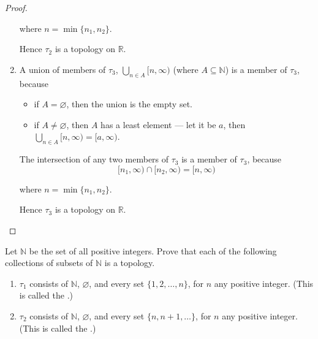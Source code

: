 \begin{proof}
\begin{enumerate}[label={(\roman*)}]
		      where $n = \min\{ n_{1}, n_{2} \}$.

		      Hence $\tau_{2}$ is a topology on $\mathbb{R}$.
		\item A union of members of $\tau_{3}$, $\bigcup_{n\in A} [n, \infty)$ (where $A\subseteq \mathbb{N}$) is a member of $\tau_{3}$, because
		      \begin{itemize}
			      \item if $A = \varnothing$, then the union is the empty set.
			      \item if $A\ne\varnothing$, then $A$ has a least element --- let it be $a$, then $\bigcup_{n\in A} [n, \infty) = [a, \infty)$.
		      \end{itemize}

		      The intersection of any two members of $\tau_{3}$ is a member of $\tau_{3}$, because
		      \[
			      [n_{1}, \infty) \cap [n_{2}, \infty) = [n, \infty)
		      \]

		      where $n = \min\{ n_{1}, n_{2} \}$.

		      Hence $\tau_{3}$ is a topology on $\mathbb{R}$.
	\end{enumerate}
\end{proof}
\newpage

\begin{exercise}
	Let $\mathbb{N}$ be the set of all positive integers. Prove that each of the following collections of subsets of $\mathbb{N}$ is a topology.
	\begin{enumerate}[label={(\roman*)}]
		\item $\tau_{1}$ consists of $\mathbb{N}$, $\varnothing$, and every set $\{ 1, 2, \ldots, n \}$, for $n$ any positive integer. (This is called the {\color{red}{initial segment topology}}.)
		\item $\tau_{2}$ consists of $\mathbb{N}$, $\varnothing$, and every set $\{ n, n+1, \ldots \}$, for $n$ any positive integer. (This is called the {\color{red}{final segment topology}}.)
	\end{enumerate}
\end{exercise}

